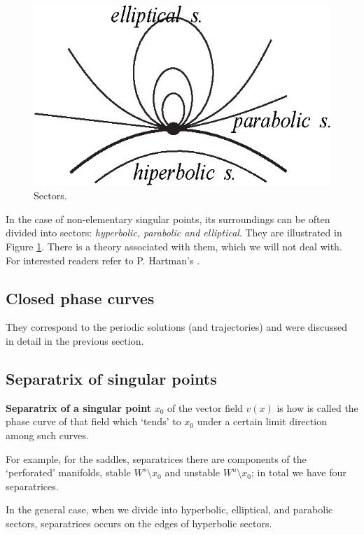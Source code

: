 \begin{figure}[!ht]
	\centering
	\includegraphics [scale=1.4]{jtr219}
	\caption{Sectors.}
	\label{fig:2.19}
\end{figure}

In the case of non-elementary singular points, its surroundings can be often divided into sectors: \textit{hyperbolic, parabolic and elliptical}. They are illustrated in Figure \ref{fig:2.19}. There is a theory associated with them, which we will not deal with. For interested readers refer to P. Hartman's \cite{Hart}.

\subsection{Closed phase curves}
They correspond to the periodic solutions (and trajectories) and were discussed in detail in the previous section.

\subsection{Separatrix of singular points}
\begin{definition}
	\textbf{Separatrix of a singular point} $x_0$ of the vector field $v (x)$ is how is called the phase curve of that field which `tends' to $x_0$ under a certain limit direction among such curves.
\end{definition}

For example, for the saddles, separatrices there are components of the `perforated' manifolds, stable $ W ^ {s} \setminus x_ {0} $ and unstable $ W ^ {u} \setminus x_ {0} $; in total we have four separatrices.

In the general case, when we divide into hyperbolic, elliptical, and parabolic sectors, separatrices occurs on the edges of hyperbolic sectors.

